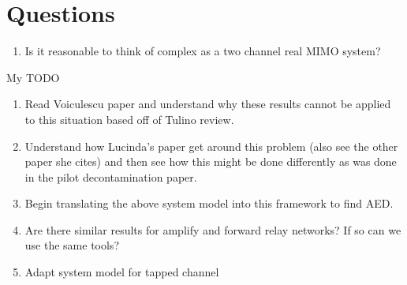 \documentclass[12pt,a4paper]{report}
\begin{document}

\chapter{Questions}
\begin{enumerate}
\item Is it reasonable to think of complex as a two channel real MIMO system?
\end{enumerate}


My TODO
\begin{enumerate}
	\item
		Read Voiculescu paper and understand why these results cannot be applied to this situation based off of Tulino review.
		
	\item 
		Understand how Lucinda's paper get around this problem (also see the other paper she cites) and then see how this might be done differently as was done in the pilot decontamination paper. 
		
	\item Begin translating the above system model into this framework to find AED.
	\item Are there similar results for amplify and forward relay networks? If so can we use the same tools?
	\item Adapt system model for tapped channel
	
	

\end{enumerate}




\end{document}

